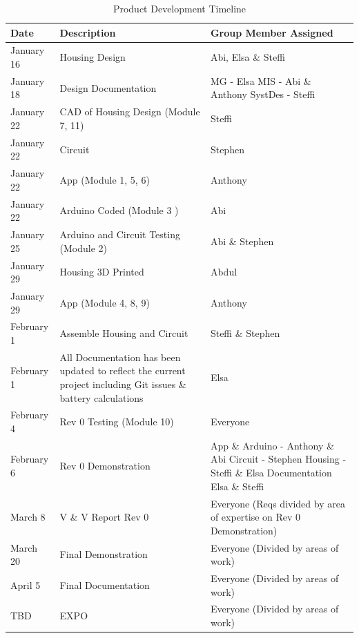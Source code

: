 \documentclass[12pt, titlepage]{article}
\begin{document}
\begin{table}[hp]
\caption{\label{Product Development Timeline}  Product Development Timeline}
\begin{tabular}{| p{} | p{} | p{} |}
 \hline
 Date & Description & Group Member Assigned\\ 
 \hline
 January 16 & Housing Design & Abi, Elsa \& Steffi\\ 
 \hline
 January 18 & Design Documentation & MG - Elsa \newline MIS - Abi \& Anthony \newline SystDes - Steffi\\ 
  \hline
  January 22 & CAD of Housing Design (Module 7, 11) & Steffi\\ 
  \hline
    January 22 & Circuit & Stephen\\ 
  \hline
    January 22 & App (Module 1, 5, 6) & Anthony\\ 
    \hline
    January 22 & Arduino Coded (Module 3 )& Abi\\ 
  \hline
   January 25 & Arduino and Circuit Testing (Module 2) & Abi \& Stephen\\ 
  \hline
   January 29 & Housing 3D Printed & Abdul\\ 
  \hline
     January 29 &App (Module 4, 8, 9) & Anthony\\
  \hline
    February 1& Assemble Housing and Circuit & Steffi \& Stephen\\ 
  \hline
   February 1& All Documentation has been updated to reflect the current project including Git issues \& battery calculations& Elsa\\
  \hline
      February 4 & Rev 0 Testing (Module 10) & Everyone\\ 
  \hline
  February 6 & Rev 0 Demonstration & App \& Arduino - Anthony \& Abi \newline Circuit - Stephen \newline Housing - Steffi \& Elsa \newline Documentation Elsa \& Steffi\\
  \hline
  March 8 & V \& V Report Rev 0 & Everyone \newline(Reqs divided by area of expertise on Rev 0 Demonstration)\\
  \hline
 March 20 & Final Demonstration & Everyone \newline(Divided by areas of work)\\
 \hline
 April 5 & Final Documentation & Everyone \newline(Divided by areas of work)\\
 \hline
 TBD & EXPO & Everyone (Divided by areas of work)\\
 \hline
\end{tabular}
\end{table}
\end{document}
